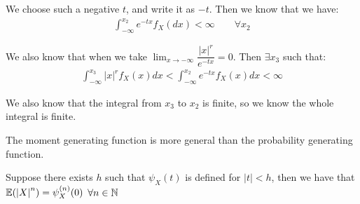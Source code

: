 \begin{prf}[]{}
  \par\bigskip
  \noindent We choose such a negative $t$, and write it as $-t$. Then we know that we have:
  \begin{equation*}
    \begin{gathered}
      \int_{-\infty}^{x_2}e^{-tx}f_X(dx)<\infty\qquad\forall x_2
    \end{gathered}
  \end{equation*}
  \par\bigskip
  \noindent We also know that when we take $\lim_{x\to-\infty}\dfrac{\left|x\right|^r}{e^{-tx}}=0$. Then $\exists x_3$ such that:
  \begin{equation*}
    \begin{gathered}
      \int_{-\infty}^{x_3}\left|x\right|^rf_X(x)dx<\int_{-\infty}^{x_2}e^{-tx}f_X(x)dx<\infty
    \end{gathered}
  \end{equation*}
  \par\bigskip
  \noindent We also know that the integral from $x_3$ to $x_2$ is finite, so we know the whole integral is finite.
\end{prf}
\par\bigskip
\noindent The moment generating function is more general than the probability generating function.
\begin{theo}[]{}
  Suppose there exists $h$ such that $\psi_X(t)$ is defined for $\left|t\right|<h$, then we have that $\mathbb{E}(\left|X\right|^n) = \psi_X^{(n)}(0)$ $\forall n\in\mathbb{N}$
\end{theo}
\pagebreak
